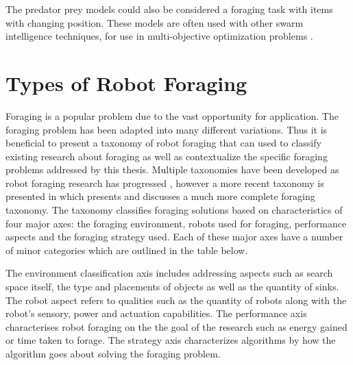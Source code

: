 The predator prey models could also be considered a foraging task with items with changing position. These models are often used with other swarm intelligence techniques, for use in multi-objective optimization problems \cite{nolfi1998coevolving}.


\section{Types of Robot Foraging}
\label{sec:second:types}

Foraging is a popular problem due to the vast opportunity for application. The foraging problem has been adapted into many different variations. Thus it is beneficial to present a taxonomy of robot foraging that can used to classify existing research about foraging as well as contextualize the specific foraging problems addressed by this thesis. Multiple taxonomies have been developed as robot foraging research has progressed \cite{oster1978caste,ostergaard2001emergent}, however a more recent taxonomy is presented in \cite{winfield2009foraging} which presents and discusses a much more complete foraging taxonomy. The taxonomy classifies foraging solutions based on characteristics of four major axes: the foraging environment, robots used for foraging, performance aspects and the foraging strategy used. Each of these major axes have a number of minor categories which are outlined in the table below.  

The environment classification axis includes addressing aspects such as search space itself, the type and placements of objects as well as the quantity of sinks. The robot aspect refers to qualities such as  the quantity of robots along with the robot's sensory, power and actuation capabilities. The performance axis characterises robot foraging on the the goal of the research such as energy gained or time taken to forage. The strategy axis characterizes algorithms by how the algorithm goes about solving the foraging problem. 

